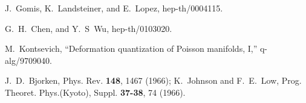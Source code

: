 \documentclass[a4paper,12pt]{article}
\begin{document}
\begin{thebibliography}{bib}
J.~Gomis, K.~Landsteiner, and E.~Lopez,
hep-th/0004115.
  
G.~H.~Chen, and Y.~S~Wu, hep-th/0103020.
  
M.~Kontsevich, ``Deformation quantization of
  Poisson manifolds, I,'' q-alg/9709040.
  
J.~D.~Bjorken, Phys. Rev. {\bf 148}, 1467 (1966);
  K.~Johnson and F.~E.~Low, Prog. Theoret. Phys.(Kyoto), Suppl.{\bf
    37-38}, 74 (1966).

\end{thebibliography}
\end{document}
